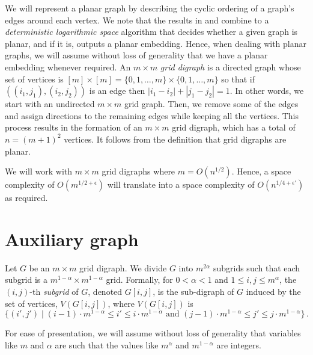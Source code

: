 \documentclass[11pt]{article}
\numberwithin{equation}{section}
\theoremstyle{definition}
\theoremstyle{plain}
\begin{document}
%
We will represent a planar graph by describing the
%
cyclic  %
ordering of a graph's edges around each vertex. %
%
%
%
%
%
We note that %
%
the results in %
\cite{AllenderMahajan} and \cite{Reingold} %
%
combine to %
a \emph{deterministic logarithmic space} algorithm that decides
whether %
a given graph is planar, and if it is, outputs a planar embedding. Hence, when dealing with planar graphs, we will assume without loss of generality that we have a planar embedding whenever required.   %
%
%
%
%
An  %
$m\times m$
%
\emph{grid digraph} %
is a directed graph %
%
whose 
%
set of vertices is %
$[m] \times [m] = \{0,1,\ldots,m\}\times\{0,1,\ldots,m\}$ so that if $((i_1,j_1),(i_2,j_2)) $ is an edge then $|i_1-i_2|+|j_1-j_2|=1$.  
In other words, we start with an undirected $m\times m$ grid graph. Then, we
%
remove some of the edges and assign directions to the remaining edges while keeping all the vertices. This process results in the formation of an $m\times m$ grid digraph, which has a total of $n=(m+1)^2$ vertices. %
 It follows from the definition that grid 
digraphs %
are %
%
planar.  %
%
%

We will work with $m\times m$ grid 
digraphs %
where $m = O(n^{1/2})$. Hence, a
%
space complexity  %
of $O(m^{1/2 + \epsilon})$ will translate into a space complexity of $O(n^{1/4 + \epsilon'})$ as required.


\section{Auxiliary graph}
\label{sec:aux}
Let $G$ be an $m \times m$ grid 
digraph. %
We divide $G$ into $m^{2\alpha}$ subgrids such that each subgrid is a $m^{1-\alpha} \times m^{1-\alpha}$ grid. Formally, for 
$0 < \alpha < 1$ and %
$1 \leq i,j \leq m^{\alpha}$, the $(i,j)$-th \emph{subgrid} of $G$,
denoted %
$G[i,j]$,  %
is the %
sub-digraph %
of $G$ induced by the set of vertices, $V(G[i,j])$, where $V(G[i, j])$
is %
\[\{(i',j') \mid (i-1)\cdot m^{1-\alpha} \leq i' \leq i\cdot m^{1-\alpha} \textrm{ and } (j-1)\cdot m^{1-\alpha} \leq j' \leq j\cdot m^{1-\alpha} \}\,.\]
%

For ease of presentation, we will assume without loss of generality that variables like $m$ and $\alpha$ are such that the values like $m^{\alpha}$ and $m^{1-\alpha}$ are integers. %
\end{document}
